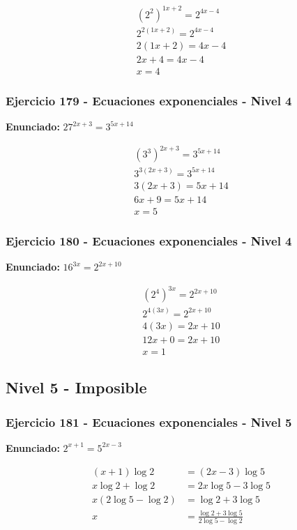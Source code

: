 \documentclass[12pt,a4paper]{article}
\begin{document}
\[
\begin{aligned}
(2^{2})^{1x+2}=2^{4x-4}\\
2^{2(1x+2)}=2^{4x-4}\\
2(1x+2)=4x-4\\
2x+4=4x-4\\
\boxed{x=4}
\end{aligned}
\]


\subsubsection*{Ejercicio 179 - Ecuaciones exponenciales - Nivel 4}
\textbf{Enunciado:} \(27^{2x+3}=3^{5x+14}\)

\[
\begin{aligned}
(3^{3})^{2x+3}=3^{5x+14}\\
3^{3(2x+3)}=3^{5x+14}\\
3(2x+3)=5x+14\\
6x+9=5x+14\\
\boxed{x=5}
\end{aligned}
\]


\subsubsection*{Ejercicio 180 - Ecuaciones exponenciales - Nivel 4}
\textbf{Enunciado:} \(16^{3x}=2^{2x+10}\)

\[
\begin{aligned}
(2^{4})^{3x}=2^{2x+10}\\
2^{4(3x)}=2^{2x+10}\\
4(3x)=2x+10\\
12x+0=2x+10\\
\boxed{x=1}
\end{aligned}
\]


\newpage

\subsection*{Nivel 5 - Imposible}

\subsubsection*{Ejercicio 181 - Ecuaciones exponenciales - Nivel 5}
\textbf{Enunciado:} \(2^{x+1}=5^{2x-3}\)

\[
\begin{aligned}
(x+1)\log 2&=(2x-3)\log 5\\
x\log2+\log2&=2x\log5-3\log5\\
x(2\log5-\log2)&=\log2+3\log5\\
x&=\boxed{\frac{\log2+3\log5}{2\log5-\log2}}
\end{aligned}
\]
\end{document}
